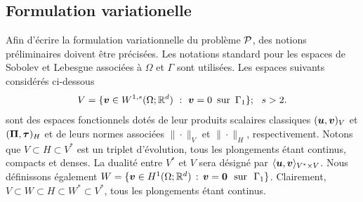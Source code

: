 \medskip

\subsection{Formulation variationelle}

Afin d'écrire la formulation variationnelle du problème $ {\cal P} $, des notions préliminaires doivent être précisées. Les notations standard pour les espaces de Sobolev et Lebesgue associées à $\Omega$
et $\Gamma$ sont utilisées. Les espaces suivants considérés ci-dessous
$$
V=\{\mbox{\boldmath{$v$}}\in W^{1,s}(\Omega;\mathbb{R}^d)\,\,:\,\,\mbox{\boldmath{$v$}}=0\,\,\,\text{sur}\,\,\,\Gamma_1\};\,\,\,\,s > 2.
$$
sont des espaces fonctionnels dotés de leur produits scalaires classiques $(\mbox{\boldmath{$u$}},\mbox{\boldmath{$v$}})_V$ et $(\boldsymbol{\Pi},\mbox{\boldmath{$\tau$}})_H$ et de leurs normes associées $\|\cdot\|_{V}$ et $\|\cdot\|_{H}$, respectivement. Notons que
$V\subset H\subset V^*$ est un triplet d'évolution, tous les plongements étant continus, compacts et denses. La dualité entre $V^*$ et $V$ sera désigné par
$\langle\mbox{\boldmath{$u$}},\mbox{\boldmath{$v$}}\rangle_{{V^*}\times{V}}$. Nous définissons également $W = \{ \mbox{\boldmath{$v$}} \in H^{1}(\Omega;\mathbb{R}^d)\, : \, \mbox{\boldmath{$v$}}=\mbox{\boldmath{$0$}}\ \ \textrm{sur}\ \ \Gamma_1 \} $. Clairement, $V\subset W \subset H \subset W^*\subset V^*$, tous les plongements étant continus.\\

